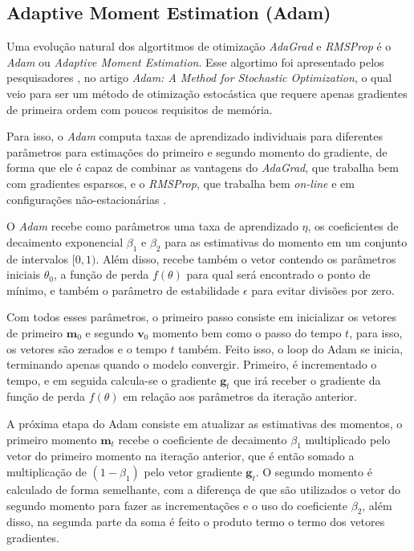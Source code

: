 \subsection{Adaptive Moment Estimation (Adam)} 

Uma evolução natural dos algortitmos de otimização \textit{AdaGrad} e \textit{RMSProp} é o \textit{Adam} ou \textit{Adaptive Moment Estimation}. Esse algortimo foi apresentado pelos pesquisadores \textcite{AdamMethod}, no artigo \textit{Adam: A Method for Stochastic Optimization}, o qual veio para ser um método de otimização estocástica que requere apenas gradientes de primeira ordem com poucos requisitos de memória.

Para isso, o \textit{Adam} computa taxas de aprendizado individuais para diferentes parâmetros para estimações do primeiro e segundo momento do gradiente, de forma que ele é capaz de combinar as vantagens do \textit{AdaGrad}, que trabalha bem com gradientes esparsos, e o \textit{RMSProp}, que trabalha bem \textit{on-line} e em configurações não-estacionárias \parencite{AdamMethod}.

O \textit{Adam} recebe como parâmetros uma taxa de aprendizado $\eta$, os coeficientes de decaimento exponencial $\beta_1$ e $\beta_2$ para as estimativas do momento em um conjunto de intervalos $[0, 1)$. Além disso, recebe também o vetor contendo os parâmetros iniciais $\theta_0$, a função de perda $f(\theta)$ para qual será encontrado o ponto de mínimo, e também o parâmetro de estabilidade $\epsilon$ para evitar divisões por zero.

Com todos esses parâmetros, o primeiro passo consiste em inicializar os vetores de primeiro $\mathbf{m}_0$ e segundo $\mathbf{v}_0$ momento bem como o passo do tempo $t$, para isso, os vetores são zerados e o tempo $t$ também. Feito isso, o loop do Adam se inicia, terminando apenas quando o modelo convergir. Primeiro, é incrementado o tempo, e em seguida calcula-se o gradiente $\mathbf{g}_t$ que irá receber o gradiente da função de perda $f(\theta)$ em relação aos parâmetros da iteração anterior.

A próxima etapa do Adam consiste em atualizar as estimativas des momentos, o primeiro momento $\mathbf{m}_t$ recebe o coeficiente de decaimento $\beta_1$ multiplicado pelo vetor do primeiro momento na iteração anterior, que é então somado a multiplicação de $(1 - \beta_1)$ pelo vetor gradiente $\mathbf{g}_t$. O segundo momento é calculado de forma semelhante, com a diferença de que são utilizados o vetor do segundo momento para fazer as incrementações e o uso do coeficiente $\beta_2$, além disso, na segunda parte da soma é feito o produto termo o termo dos vetores gradientes.

